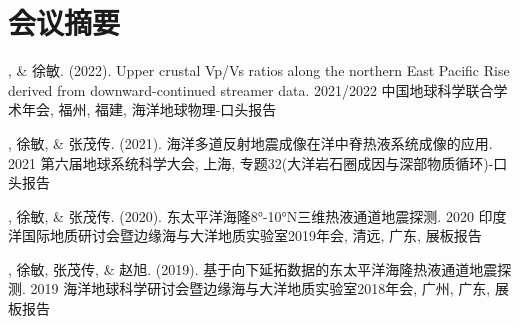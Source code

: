 \section{会议摘要}

\begin{etaremune}
\item \狄, \& 徐敏. (2022).
    Upper crustal Vp/Vs ratios along the northern East Pacific Rise derived from downward-continued streamer data.
    2021/2022 中国地球科学联合学术年会, 福州, 福建, 海洋地球物理-口头报告
\item \狄, 徐敏, \& 张茂传. (2021).
    海洋多道反射地震成像在洋中脊热液系统成像的应用.
    2021 第六届地球系统科学大会, 上海, 专题32(大洋岩石圈成因与深部物质循环)-口头报告
\item \狄, 徐敏, \& 张茂传. (2020).
    东太平洋海隆8°-10°N三维热液通道地震探测.
    2020 印度洋国际地质研讨会暨边缘海与大洋地质实验室2019年会, 清远, 广东, 展板报告
\item \狄, 徐敏, 张茂传, \& 赵旭. (2019).
    基于向下延拓数据的东太平洋海隆热液通道地震探测.
    2019 海洋地球科学研讨会暨边缘海与大洋地质实验室2018年会, 广州, 广东, 展板报告
\end{etaremune}

